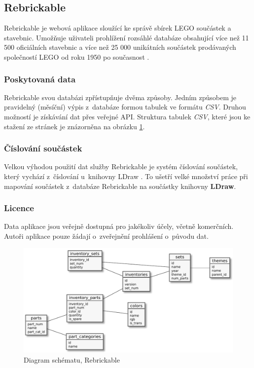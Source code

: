 \subsection{Rebrickable}\label{reserse-rebrickable}
  Rebrickable \autocite{rebrickable:homepage} je webová aplikace sloužící ke správě sbírek LEGO součástek a stavebnic. Umožňuje uživateli prohlížení rozsáhlé databáze obsahující více než 11 500 oficiálních stavebnic a více než 25 000 unikátních součástek prodávaných společností LEGO od roku 1950 po současnost \autocite{rebrickable:about}. 

  \subsubsection*{Poskytovaná data}  
  Rebrickable svou databázi zpřístupňuje dvěma způsoby. Jedním způsobem je pravidelný (měsíční) výpis z~databáze formou tabulek ve formátu \textit{\gls{CSV}}. Druhou možností je získávání dat přes veřejné \gls{API}. Struktura tabulek \textit{\gls{CSV}}, které jsou ke stažení ze stránek \autocite{rebrickable:download} je znázorněna na obrázku \ref{diagram-rebrickable}.

  \subsubsection*{Číslování součástek}
  Velkou výhodou použití dat služby Rebrickable je systém číslování součástek, který vychází z~číslování u~knihovny LDraw \autocite{rebrickable:faq}. To ušetří velké množství práce při mapování součástek z~databáze Rebrickable na součástky knihovny \textbf{LDraw}. 
  
  \subsubsection*{Licence}
  Data aplikace jsou veřejně dostupná pro jakékoliv účely, včetně komerčních. Autoři aplikace pouze žádají o~zveřejnění prohlášení o~původu dat. \autocite{rebrickable:terms}
  
  \begin{figure}[htbp]
    \centering
    \includegraphics[width=\textwidth,height=\textheight,keepaspectratio]{pdfs/rebrickable_schema}
    \caption{Diagram schématu, Rebrickable \autocite{rebrickable:download}\label{diagram-rebrickable}}
  \end{figure}

